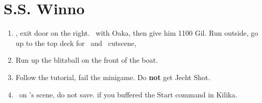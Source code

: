 \chapter{S.S. Winno}
\begin{enumerate}
	\item \cs[1:10], exit door on the right. \sd\ with Oaka, then give him 1100 Gil. Run outside, go up to the top deck for \wakka\ and \lulu\ cutscene, \sd
	\item Run up the blitzball on the front of the boat. \cs[1:10]
	\item Follow the tutorial, fail the minigame. Do \textbf{not} get Jecht Shot.
	\item \sd\ on \yuna's scene, do not save. \skippablefmv[0:30] if you buffered the Start command in Kilika.
\end{enumerate}